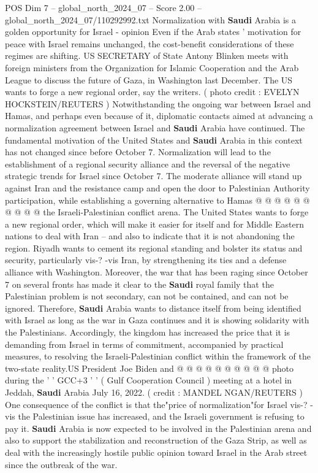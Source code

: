 \begin{textsample}{POS Dim 7 – global\_north\_2024\_07 – Score 2.00 – global\_north\_2024\_07/110292992.txt}  \label{ex:f7_pos_332}
Normalization with \textbf{Saudi} Arabia is a golden opportunity for Israel - opinion Even if the Arab states ' motivation for peace with Israel remains unchanged, the cost-benefit considerations of these regimes are shifting.
US SECRETARY of State Antony Blinken meets with foreign ministers from the Organization for Islamic Cooperation and the Arab League to discuss the future of Gaza, in Washington last December.
The US wants to forge a new regional order, say the writers. ( photo credit : EVELYN HOCKSTEIN/REUTERS ) Notwithstanding the ongoing war between Israel and Hamas, and perhaps even because of it, diplomatic contacts aimed at advancing a normalization agreement between Israel and \textbf{Saudi} Arabia have continued.
The fundamental motivation of the United States and \textbf{Saudi} Arabia in this context has not changed since before October 7.
Normalization will lead to the establishment of a regional security alliance and the reversal of the negative strategic trends for Israel since October 7.
The moderate alliance will stand up against Iran and the resistance camp and open the door to Palestinian Authority participation, while establishing a governing alternative to Hamas @ @ @ @ @ @ @ @ @ @ the Israeli-Palestinian conflict arena.
The United States wants to forge a new regional order, which will make it easier for itself and for Middle Eastern nations to deal with Iran -- and also to indicate that it is not abandoning the region.
Riyadh wants to cement its regional standing and bolster its status and security, particularly vis-? -vis Iran, by strengthening its ties and a defense alliance with Washington.
Moreover, the war that has been raging since October 7 on several fronts has made it clear to the \textbf{Saudi} royal family that the Palestinian problem is not secondary, can not be contained, and can not be ignored.
Therefore, \textbf{Saudi} Arabia wants to distance itself from being identified with Israel as long as the war in Gaza continues and it is showing solidarity with the Palestinians.
Accordingly, the kingdom has increased the price that it is demanding from Israel in terms of commitment, accompanied by practical measures, to resolving the Israeli-Palestinian conflict within the framework of the two-state reality.US President Joe Biden and @ @ @ @ @ @ @ @ @ @ photo during the ' ' GCC+3 ' ' ( Gulf Cooperation Council ) meeting at a hotel in Jeddah, \textbf{Saudi} Arabia July 16, 2022. ( credit : MANDEL NGAN/REUTERS ) One consequence of the conflict is that the"price of normalization"for Israel vis-? -vis the Palestinian issue has increased, and the Israeli government is refusing to pay it. \textbf{Saudi} Arabia is now expected to be involved in the Palestinian arena and also to support the stabilization and reconstruction of the Gaza Strip, as well as deal with the increasingly hostile public opinion toward Israel in the Arab street since the outbreak of the war.

\end{textsample}
